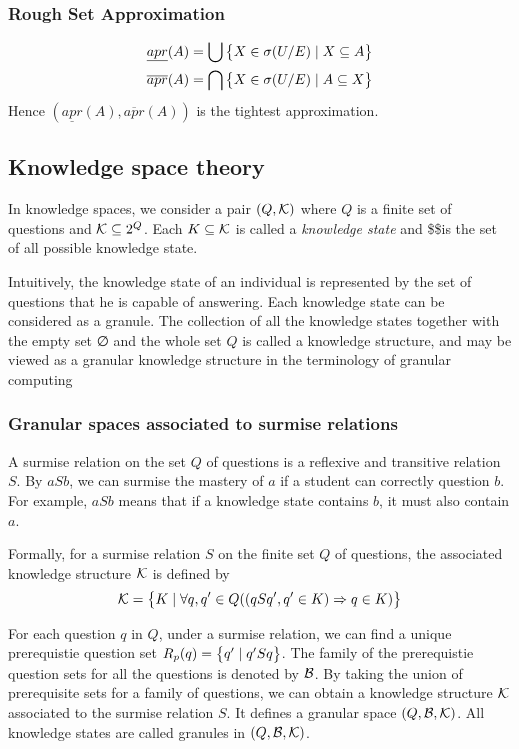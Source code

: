 \documentclass[11pt]{article}
\begin{document}
\subsubsection{Rough Set Approximation}
\label{sec:org3f34417}
\begin{align*}
  &\underline{apr}(A)=\bigcup\left\{ X\in\sigma(U/E)\mid X\subseteq A\right\}\\
  &\overline{apr}(A)=\bigcap\left\{ X\in\sigma(U/E)\mid A\subseteq X\right\}\\
\end{align*}
Hence \((\underline{apr}(A),\overline{apr}(A))\) is the tightest approximation.
\subsection{Knowledge space theory}
\label{sec:org7280556}
In knowledge spaces, we consider a pair \((Q,\mathcal{K})\) where \(Q\) is a finite set
of questions and \(\mathcal{K}\subseteq 2^Q\). Each \(K\subseteq\mathcal{K}\) is called a
\emph{knowledge state} and \$\calk\$is the set of all possible knowledge state.


Intuitively, the knowledge state of an individual is represented by the set
of questions that he is capable of answering. Each knowledge state can be
considered as a granule. The collection of all the knowledge states together
with the empty set ∅ and the whole set \(Q\) is called a knowledge structure, and
may be viewed as a granular knowledge structure in the terminology of
granular computing 
\subsubsection{Granular spaces associated to surmise relations}
\label{sec:orgec6f979}
A surmise relation on the set \(Q\) of questions is a reflexive and transitive
relation \(S\). By \(aSb\), we can surmise the mastery of \(a\) if a student can
correctly question \(b\). For example, \(aSb\) means that if a knowledge state
contains \(b\), it must also contain \(a\).

Formally, for a surmise relation \(S\) on the finite set \(Q\) of questions, the
associated knowledge structure \(\mathcal{K}\) is defined by
\begin{equation*}
\mathcal{K}=\left\{ K\mid\forall q,q'\in Q((qSq',q'\in K)\Rightarrow q\in K)\right\}
\end{equation*}

For each question \(q\) in \(Q\), under a surmise relation, we can find a unique
prerequistie question set \(R_p(q)=\left\{ q'\mid q'Sq\right\}\). The family of the
prerequistie question sets for all the questions is denoted by \(\mathcal{B}\). By taking
the union of prerequisite sets for a family of questions, we can obtain a
knowledge structure \(\mathcal{K}\) associated to the surmise relation \(S\). It
defines a granular space \((Q,\mathcal{B},\mathcal{K})\). All knowledge states are called
granules in \((Q,\mathcal{B},\mathcal{K})\). 
\end{document}
